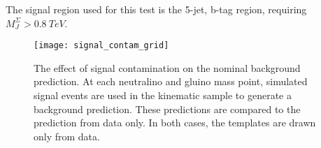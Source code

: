 The signal region used for this test is the 5-jet, b-tag region,
requiring $M_J^{\Sigma}>0.8~TeV$.

\begin{figure}[!ht]
    \texttt{[image: signal\_contam\_grid]}
    \caption{The effect of signal contamination on the nominal background prediction.
    At each neutralino and gluino mass point, simulated signal events are used in the kinematic sample to generate a background prediction.
    These predictions are compared to the prediction from data only.
    In both cases, the templates are drawn only from data.}
    \label{fig:signal_contam_grid}
\end{figure}
